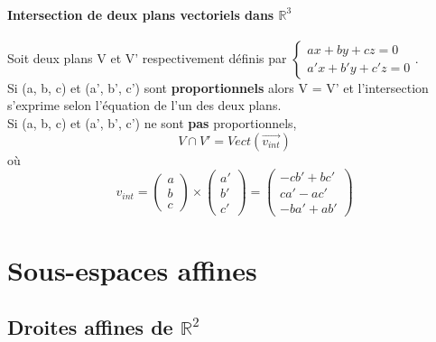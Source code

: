\documentclass[10pt,a4paper]{book}
\newcommand{\R}{\mathbb{R}}
\begin{document}
\paragraph{Intersection de deux plans vectoriels dans $\R^3$}
Soit deux plans V et V' respectivement définis par \(\left\lbrace \begin{array}{rcl}
ax + by + cz = 0 \\
a'x + b'y + c'z = 0
\end{array} \right.\). \\
Si (a, b, c) et (a', b', c') sont \textbf{proportionnels} alors V = V' et l'intersection s'exprime selon l'équation de l'un des deux plans. \\
Si (a, b, c) et (a', b', c') ne sont \textbf{pas} proportionnels, 
\[V\cap V' = Vect(\vec{v_{int}})\]
où
\[v_{int} = \begin{pmatrix} a \\ b \\ c \end{pmatrix} \times \begin{pmatrix} a' \\ b' \\ c' \end{pmatrix} = \begin{pmatrix} -cb' + bc' \\ ca' - ac' \\ -ba' + ab'\end{pmatrix}\]

\section{Sous-espaces affines}

\subsection{Droites affines de \texorpdfstring{$\R^2$}{R2}}
\end{document}
